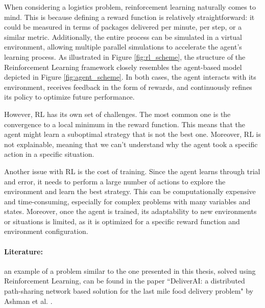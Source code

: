 When considering a logistics problem, reinforcement learning naturally comes to
mind. This is because defining a reward function is relatively straightforward:
it could be measured in terms of packages delivered per minute, per step, or a
similar metric. Additionally, the entire process can be simulated in a virtual
environment, allowing multiple parallel simulations to accelerate the agent's learning
process. As illustrated in Figure \ref{fig:rl_scheme}, the structure of the Reinforcement
Learning framework closely resembles the agent-based model depicted in Figure \ref{fig:agent_scheme}.
In both cases, the agent interacts with its environment, receives feedback in
the form of rewards, and continuously refines its policy to optimize future performance.

However, RL has its own set of challenges. The most common one is the convergence
to a local minimum in the reward function. This means that the agent might learn
a suboptimal strategy that is not the best one. Moreover, RL is not explainable,
meaning that we can't understand why the agent took a specific action in a specific
situation.

Another issue with RL is the cost of training. Since the agent learns through
trial and error, it needs to perform a large number of actions to explore the environment
and learn the best strategy. This can be computationally expensive and time-consuming,
especially for complex problems with many variables and states. Moreover, once the
agent is trained, its adaptability to new environments or situations is limited,
as it is optimized for a specific reward function and environment configuration.

\paragraph{Literature:}
an example of a problem similar to the one presented in this thesis, solved using
Reinforcement Learning, can be found in the paper ``DeliverAI: a distributed path-sharing
network based solution for the last mile food delivery problem" by Ashman et al.
\cite{mehra2024deliveraireinforcementlearningbased}.

